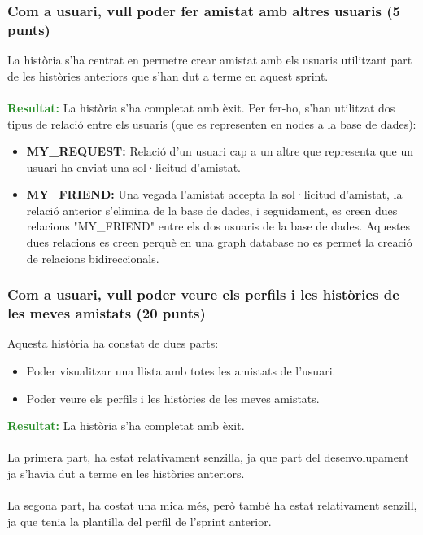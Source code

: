 \documentclass[11pt,catalan,listoffigures,listoftables]{tfgetsinf}
\begin{document}
\subsubsection{Com a usuari, vull poder fer amistat amb altres usuaris (5 punts)}
La història s'ha centrat en permetre crear amistat amb els usuaris utilitzant part de les històries anteriors que s'han dut a terme en aquest sprint.\\ \\
\textcolor{forestgreen}{\textbf{Resultat:}} La història s'ha completat amb èxit. Per fer-ho, s'han utilitzat dos tipus de relació entre els usuaris (que es representen en nodes a la base de dades):
\begin{itemize}
\item \textbf{MY\_REQUEST:} Relació d'un usuari cap a un altre que representa que un usuari ha enviat una sol·licitud d'amistat.
\item \textbf{MY\_FRIEND:} Una vegada l'amistat accepta la sol·licitud d'amistat, la relació anterior s'elimina de la base de dades, i seguidament, es creen dues relacions "MY\_FRIEND" entre els dos usuaris de la base de dades. Aquestes dues relacions es creen perquè en una graph database no es permet la creació de relacions bidireccionals.
\end{itemize}

\subsubsection{Com a usuari, vull poder veure els perfils i les històries de les meves amistats (20 punts)}

Aquesta història ha constat de dues parts:
\begin{itemize}
\item Poder visualitzar una llista amb totes les amistats de l'usuari.
\item Poder veure els perfils i les històries de les meves amistats.
\end{itemize}
\textcolor{forestgreen}{\textbf{Resultat:}} La història s'ha completat amb èxit.\\ \\
La primera part, ha estat relativament senzilla, ja que part del desenvolupament ja s'havia dut a terme en les històries anteriors.\\ \\
La segona part, ha costat una mica més, però també ha estat relativament senzill, ja que tenia la plantilla del perfil de l'sprint anterior.
\end{document}

